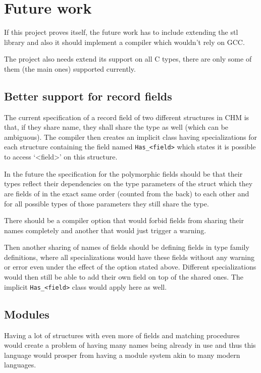 \section{Future work}

If this project proves itself, the future work has to include extending the stl library and also it should implement a compiler which wouldn't rely on GCC.

The project also needs extend its support on all C types, there are only some of them (the main ones) supported currently.

\subsection{Better support for record fields}

The current specification of a record field of two different structures in CHM is that, if they share name, they shall share the type as well (which can be ambiguous). The compiler then creates an implicit class having specializations for each structure containing the field named \lstinline{Has_<field>} which states it is possible to access `<field>' on this structure.

In the future the specification for the polymorphic fields should be that their types reflect their dependencies on the type parameters of the struct which they are fields of in the exact same order (counted from the back) to each other and for all possible types of those parameters they still share the type.

There should be a compiler option that would forbid fields from sharing their names completely and another that would just trigger a warning.

Then another sharing of names of fields should be defining fields in type family definitions, where all specializations would have these fields without any warning or error even under the effect of the option stated above. Different specializations would then still be able to add their own field on top of the shared ones. The implicit \lstinline{Has_<field>} class would apply here as well.

\subsection{Modules}

Having a lot of structures with even more of fields and matching procedures would create a problem of having many names being already in use and thus this language would prosper from having a module system akin to many modern languages.

